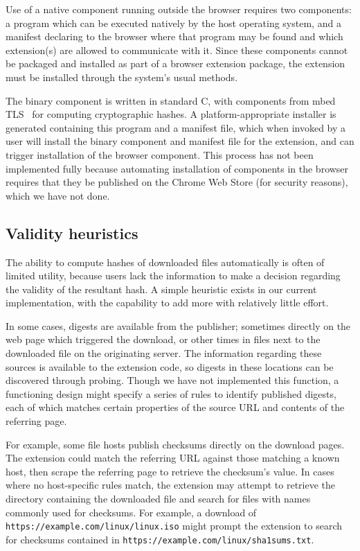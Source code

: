 \documentclass[letterpaper,twocolumn,10pt]{article}
\begin{document}
Use of a native component running outside the browser requires two components:
a program which can be executed natively by the host operating system, and a manifest
declaring to the browser where that program may be found and which extension(s) are
allowed to communicate with it. Since these components cannot be packaged and installed
as part of a browser extension package, the extension must be installed through the
system's usual methods.

The binary component is written in standard C, with components from mbed TLS~\cite{mbedtls}
for computing cryptographic hashes. A platform-appropriate installer is generated containing
this program and a manifest file, which when invoked by a user will install the binary component
and manifest file for the extension, and can trigger installation of the browser component.
This process has not been implemented fully because automating installation of components
in the browser requires that they be published on the Chrome Web Store (for security reasons),
which we have not done.

\subsection{Validity heuristics}

The ability to compute hashes of downloaded files automatically is often of limited utility,
because users lack the information to make a decision regarding the validity of the
resultant hash. A simple heuristic exists in our current implementation, with the capability
to add more with relatively little effort.

In some cases, digests are available from the publisher; sometimes directly on the web page
which triggered the download, or other times in files next to the downloaded file on the
originating server. The information regarding these sources is available to the extension
code, so digests in these locations can be discovered through probing. Though we have not
implemented this function, a functioning design might specify a series of rules to identify
published digests, each of which matches certain properties of the source URL and
contents of the referring page.

For example, some file hosts publish checksums directly on the download pages. The
extension could match the referring URL against those matching a known host, then
scrape the referring page to retrieve the checksum's value. In cases where no host-specific
rules match, the extension may attempt to retrieve the directory containing the
downloaded file and search for files with names commonly used for checksums. For
example, a download of \texttt{https://example.com/linux/linux.iso} might prompt the
extension to search for checksums contained in
\texttt{https://example.com/linux/sha1sums.txt}.
\end{document}
